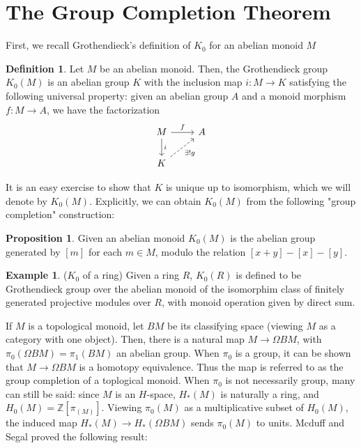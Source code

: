 \documentclass{article}
\theoremstyle{definition}
\theoremstyle{definition}
\newtheorem{definition}{Definition}[theorem]
\theoremstyle{definition}
\theoremstyle{definition}
\newtheorem{proposition}{Proposition}[theorem]
\theoremstyle{definition}
\theoremstyle{definition}
\theoremstyle{definition}
\newtheorem{example}{Example}[theorem]
\begin{document}
\section{The Group Completion Theorem }
First, we recall Grothendieck's definition of $K_0$ for an abelian monoid $M$
\begin{tcolorbox}[colback=purple!5!white,colframe=purple!75!black]
    \begin{definition}
        Let $M$ be an abelian monoid. Then, the Grothendieck group $K_0(M)$ is an abelian group $K$ with the inclusion map $i: M\to K$ satisfying the following universal property: given an abelian group $A$ and a monoid morphism $f: M\to A$, we have the factorization
        \[\begin{tikzcd}
        M\arrow[d,"i"]\arrow[r," f"]&A\\
        K\arrow[ur,dashed,swap,"\exists! g"]
        \end{tikzcd}\]
    \end{definition}
    \end{tcolorbox}
It is an easy exercise to show that $K$ is unique up to isomorphism, which we will denote by $K_0(M)$. Explicitly, we can obtain $K_0(M)$ from the following "group completion" construction: 

\begin{tcolorbox}[colback=blue!5!white,colframe=blue!30!white]
\begin{proposition}
Given an abelian monoid $K_0(M)$ is the abelian group generated by $[m]$ for each $m\in M$, modulo the relation $[x+y]-[x]-[y]$.
\end{proposition}
\end{tcolorbox}


\begin{tcolorbox}[colback=yellow!5!white,colframe=yellow!30!white]
\begin{example}
($K_0$ of a ring) Given a ring $R$, $K_0(R)$ is defined to be Grothendieck group over the abelian monoid of the isomorphim class of finitely generated projective modules over $R$, with monoid operation given by direct sum. 
\end{example}
\end{tcolorbox}

If $M$ is a topological monoid, let $BM$ be its classifying space (viewing $M$ as a category with one object). Then, there is a natural map $M\to \Omega BM$, with $\pi_0(\Omega BM)=\pi_1(BM)$ an abelian group. When $\pi_0$ is a group, it can be shown that $M\to \Omega BM$ is a homotopy equivalence. Thus the map is referred to as the group completion of a toplogical monoid. When $\pi_0$ is not necessarily group, many can still be said: since $M$ is an $H$-space, $H_*(M)$ is naturally a ring, and $H_0(M)=\mathbb{Z}[\pi_(M)]$. Viewing $\pi_0(M)$ as a multiplicative subset of $H_0(M)$, the induced map $H_*(M)\to H_*(\Omega BM)$ sends $\pi_0(M)$ to units. Mcduff and Segal proved the following result:
\end{document}

